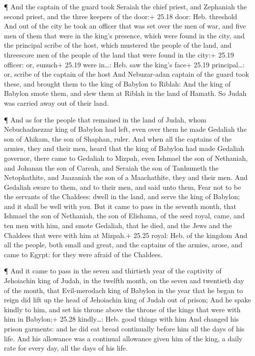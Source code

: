 ¶ And the captain of the guard took Seraiah the chief
priest, and Zephaniah the second priest, and the three keepers of the
door:+ 25.18 door: Heb. threshold  And out of the city he
took an officer that was set over the men of war, and five men of them
that were in the king's presence, which were found in the city, and the
principal scribe of the host, which mustered the people of the land, and
threescore men of the people of the land that were found in the city:+
25.19 officer: or, eunuch+ 25.19 were in\ldots: Heb. saw the king's
face+ 25.19 principal\ldots: or, scribe of the captain of the host
 And Nebuzar-adan captain of the guard took these, and
brought them to the king of Babylon to Riblah:  And the
king of Babylon smote them, and slew them at Riblah in the land of
Hamath. So Judah was carried away out of their land.

 ¶ And as for the people that remained in the land of
Judah, whom Nebuchadnezzar king of Babylon had left, even over them he
made Gedaliah the son of Ahikam, the son of Shaphan, ruler.
 And when all the captains of the armies, they and their
men, heard that the king of Babylon had made Gedaliah governor, there
came to Gedaliah to Mizpah, even Ishmael the son of Nethaniah, and
Johanan the son of Careah, and Seraiah the son of Tanhumeth the
Netophathite, and Jaazaniah the son of a Maachathite, they and their
men.  And Gedaliah sware to them, and to their men, and
said unto them, Fear not to be the servants of the Chaldees: dwell in
the land, and serve the king of Babylon; and it shall be well with you.
 But it came to pass in the seventh month, that Ishmael the
son of Nethaniah, the son of Elishama, of the seed royal, came, and ten
men with him, and smote Gedaliah, that he died, and the Jews and the
Chaldees that were with him at Mizpah.+ 25.25 royal: Heb. of the kingdom
 And all the people, both small and great, and the captains
of the armies, arose, and came to Egypt: for they were afraid of the
Chaldees.

 ¶ And it came to pass in the seven and thirtieth year of
the captivity of Jehoiachin king of Judah, in the twelfth month, on the
seven and twentieth day of the month, that Evil-merodach king of Babylon
in the year that he began to reign did lift up the head of Jehoiachin
king of Judah out of prison;  And he spake kindly to him,
and set his throne above the throne of the kings that were with him in
Babylon;+ 25.28 kindly\ldots: Heb. good things with him 
And changed his prison garments: and he did eat bread continually before
him all the days of his life.  And his allowance was a
continual allowance given him of the king, a daily rate for every day,
all the days of his life.
